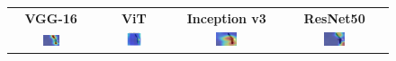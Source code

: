 \documentclass[a4paper,12pt]{report}
\begin{document}
\begin{figure}[H]
    \centering
    \setlength{\tabcolsep}{1pt}
    \begin{tabular}{cccc}
    \textbf{VGG-16} & \textbf{ViT} & \textbf{Inception v3} & \textbf{ResNet50} \\
    
    \includegraphics[width=0.22\textwidth]{images/appendix/modelgraph/vgg/correct/Slaty_Backed_Gull/480 (3).jpeg} &
    \includegraphics[width=0.22\textwidth]{images/appendix/modelgraph/vit/correct/Slaty_Backed_Gull/480 (3).jpeg} &
    \includegraphics[width=0.22\textwidth]{images/appendix/modelgraph/inception/correct/Slaty_Backed_Gull/480 (3).jpeg} &
    \includegraphics[width=0.22\textwidth]{images/appendix/modelgraph/resnet/correct/Slaty_Backed_Gull/480 (3).jpeg} \\
    \end{tabular}
 
    \label{fig:interpretability_slaty_9}
\end{figure}
\end{document}
